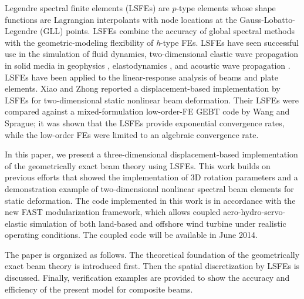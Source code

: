Legendre spectral finite elements\cite{Patera:1984,Ronquist:1987} (LSFEs)
are $p$-type elements whose shape functions are Lagrangian
interpolants with node locations at the Gauss-Lobatto-Legendre (GLL) points.
LSFEs combine the accuracy of global spectral methods with the
geometric-modeling
flexibility of {\it h}-type FEs. LSFEs have seen successful use
in the simulation of fluid dynamics\cite{Ronquist:1987, Patera:1984,
Deville:2002}, two-dimensional elastic wave propagation in solid media in
geophysics \cite{Komatitsch:1998}, elastodynamics \cite{Sridhar:2006}, and
acoustic wave propagation \cite{Sprague:2004}. LSFEs have been applied to
the linear-response analysis of
beams\cite{Ben-Tal-etal:1995,Ben-Tal-etal:1996,Kudela-etal:2007a,Sprague-Geers:2008,Wang:SFE2013}
and plate elements\cite{Zrahia-Bar-Yoseph:1995,
Kudela-etal:2007b,Sprague-Brito:2012}. Xiao and Zhong \cite{Xiao-Zhong:2012} reported  a displacement-based implementation by LSFEs for two-dimensional static nonlinear beam deformation. Their
LSFEs were compared against a mixed-formulation
low-order-FE GEBT code by Wang and
Sprague\cite{Wang:SFE2013};  it was shown that the LSFEs provide
exponential convergence rates, while the low-order FEs were limited to
an algebraic convergence rate.

In this paper, we present a three-dimensional displacement-based
implementation of the geometrically exact beam theory using LSFEs.  This work
builds on previous efforts that showed the implementation of 3D rotation
parameters\cite{Wang:GEBT2013} and a demonstration example of
two-dimensional nonlinear spectral beam elements\cite{Wang:SFE2013} for
static deformation.  The code implemented in this work is in accordance with
the new FAST modularization framework\cite{Jonkman:2013},  which allows coupled aero-hydro-servo-elastic simulation of both land-based and offshore wind turbine under realistic operating conditions. The coupled code will be available in June 2014.

The paper is organized as follows.  The theoretical foundation of the
geometrically exact beam theory is introduced first. Then the spatial
discretization by LSFEs is discussed. Finally, verification examples are
provided to show the accuracy and efficiency of the present model  for
composite beams.  



